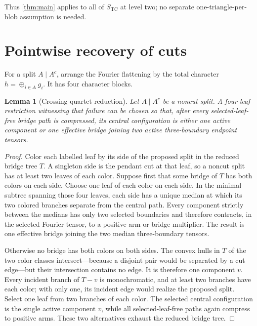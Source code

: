 \documentclass[11pt]{article}
\newtheorem{lemma}[theorem]{Lemma}
\theoremstyle{remark}
\newcommand{\TCs}{S_{\mathrm{TC}}}
\newcommand{\xor}{\mathbin\oplus}
\begin{document}
Thus \cref{thm:main} applies to all of $\TCs$ at level two; no separate
one-triangle-per-blob assumption is needed.

\section{Pointwise recovery of cuts}\label{sec:cuts}

For a split $A\mid A^c$, arrange the Fourier flattening by the total
character $h=\xor_{i\in A}g_i$.  It has four character blocks.

\begin{lemma}[Crossing-quartet reduction]\label{lem:crossing-quartet}
Let $A\mid A^c$ be a noncut split.  A four-leaf restriction witnessing that
failure can be chosen so that, after every selected-leaf-free bridge path is
compressed, its central configuration is either one active component or one
effective bridge joining two active three-boundary endpoint tensors.
\end{lemma}

\begin{proof}
Color each labelled leaf by its side of the proposed split in the reduced
bridge tree $T$.  A singleton side is the pendant cut at that leaf, so a
noncut split has at least two leaves of each color.  Suppose first that some
bridge of $T$ has both colors on each side.  Choose one leaf of each color on
each side.  In the minimal subtree spanning those four leaves, each side has
a unique median at which its two colored branches separate from the central
path.  Every component strictly between the medians has only two selected
boundaries and therefore contracts, in the selected Fourier tensor, to a
positive arm or bridge multiplier.  The result is one effective bridge
joining the two median three-boundary tensors.

Otherwise no bridge has both colors on both sides.  The convex hulls in $T$
of the two color classes intersect---because a disjoint pair would be
separated by a cut edge---but their intersection contains no edge.  It is
therefore one component $v$.  Every incident branch of $T-v$ is
monochromatic, and at least two branches have each color; with only one, its
incident edge would realize the proposed split.  Select one leaf from two
branches of each color.  The selected central configuration is the single
active component $v$, while all selected-leaf-free paths again compress to
positive arms.  These two alternatives exhaust the reduced bridge tree.
\end{proof}
\end{document}
